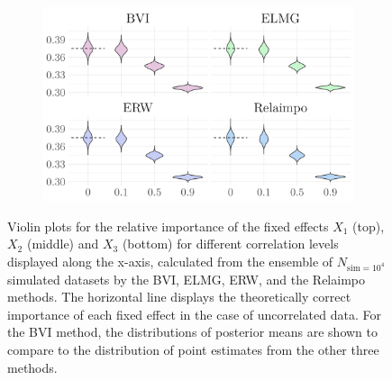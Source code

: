 \begin{figure}[H]
  \begin{subfigure}[b]{0.7\linewidth}
    \centering
    \includegraphics[width=\linewidth]{Figures/ViolinPlots/Variance_V3.png}
    \label{fig:relimp_X3_fig}
  \end{subfigure}
  
  \caption[Relative importance of the fixed effects in Gaussian LMM]{Violin plots for the relative importance of the fixed effects $X_1$ (top), $X_2$ (middle) and $X_3$ (bottom) for different correlation levels displayed along the x-axis, calculated from the ensemble of $N_{\text{sim}=10^4}$ simulated datasets by the BVI, ELMG, ERW, and the Relaimpo methods. The horizontal line displays the theoretically correct importance of each fixed effect in the case of uncorrelated data. For the BVI method, the distributions of posterior means are shown to compare to the distribution of point estimates from the other three methods.}
  \label{fig:relimp_all}
\end{figure}


